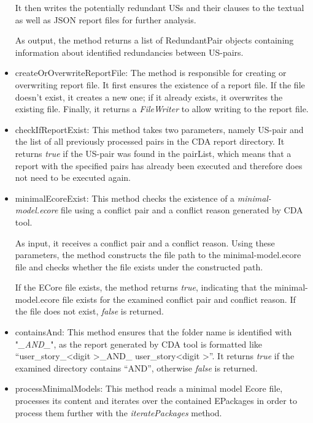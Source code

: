\begin{itemize}
	It then writes the potentially redundant USs and their clauses to the textual as well as JSON report files for further analysis.
	
	As output, the method returns a list of RedundantPair objects containing information about identified redundancies between US-pairs.
	
	\item createOrOverwriteReportFile: The method is responsible for creating or overwriting report file. It first ensures the existence of a report file. If the file doesn't exist, it creates a new one; if it already exists, it overwrites the existing file. Finally, it returns a \textit{FileWriter} to allow writing to the report file.
	
	\item checkIfReportExist: This method takes two parameters, namely US-pair and the list of all previously processed pairs in the CDA report directory. It returns \textit{true} if the US-pair was found in the pairList, which means that a report with the specified pairs has already been executed and therefore does not need to be executed again.
	
	\item minimalEcoreExist: This method checks the existence of a \textit{minimal-model.ecore} file using a conflict pair and a conflict reason generated by CDA tool.
	
	As input, it receives a conflict pair and a conflict reason. Using these parameters, the method constructs the file path to the minimal-model.ecore file and checks whether the file exists under the constructed path.
	
	If the ECore file exists, the method returns \textit{true}, indicating that the minimal-model.ecore file exists for the examined conflict pair and conflict reason. If the file does not exist, \textit{false} is returned.
	
	\item containsAnd: This method ensures that the folder name is identified with "\textit{\_AND\_}", as the report generated by CDA tool is formatted like \enquote{user\_story\_\textless digit \textgreater \_AND\_ user\_story\textless digit \textgreater}. It returns \textit{true} if the examined directory contains \enquote{AND}, otherwise \textit{false} is returned.
	
	\item processMinimalModels: This method reads a minimal model Ecore file, processes its content and iterates over the contained EPackages in order to process them further with the \textit{iteratePackages} method. 
	

\end{itemize}
